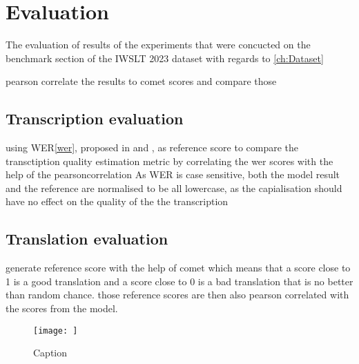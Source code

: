 
\chapter{Evaluation}
\label{ch:Evaluation}
The evaluation of results of the experiments that were concucted on the benchmark section of the IWSLT 2023 dataset \cite{sperber2024evaluating} with regards to \ref{ch:Dataset}

pearson correlate \cite{2020SciPy-NMeth} the results to comet scores and compare those 

\section{Transcription evaluation}

using WER\ref{wer}, proposed in \cite{woodard1982} and \cite{morris2004}, as reference score to compare the transctiption quality estimation metric by correlating the wer scores with the help of the pearsoncorrelation \cite{2020SciPy-NMeth}
As WER is case sensitive, both the model result and the reference are normalised to be all lowercase, as the capialisation should have no effect on the quality of the the transcription


\section{Translation evaluation}

generate reference score with the help of comet \cite{rei-etal-2020-comet} which means that a score close to 1 is a good translation and a score close to 0 is a bad translation that is no better than random chance.
those reference scores are then also pearson correlated with the scores from the model. 
\begin{figure}
    \centering
    \texttt{[image: ]}
    \caption{Caption}
    \label{fig:translationeval scatter plot}
\end{figure}

